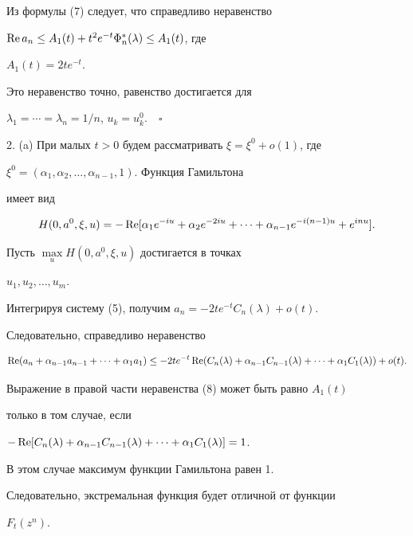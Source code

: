 Из формулы (7) следует, что справедливо неравенство 


$\operatorname{Re} a_n\le A_1(t)+t^2e^{-t}\Phi^*_n(\lambda)\le A_1(t)$, где 


$A_1(t)=2t e^{-t}$. 


Это неравенство точно, равенство достигается для 


$\lambda_1=\dotsb=\lambda_n=1/n$, $u_k=u^0_k$.$\quad\square$ 


\smallskip 


 


2. (a) При малых $t>0$ будем рассматривать $\xi=\xi^0+o(1)$, где 


$\xi^0=(\alpha_1,\alpha_2,\dotsc,\alpha_{n-1},1)$. Функция Гамильтона 


имеет вид 


$$ 


H(0,a^0,\xi,u)=-\re[\alpha_1 e^{-i u}+\alpha_2e^{-2i u}+\dotsb+ 


\alpha_{n-1}e^{-i(n-1)u}+e^{i n u}]. 


$$ 


Пусть $\max\limits_u H(0,a^0,\xi,u)$ достигается в точках 


$u_1,u_2,\dotsc,u_m$. 


Интегрируя систему (5), получим $a_n=-2t e^{-t}C_n(\lambda)+o(t)$. 


Следовательно, справедливо неравенство 


\begin{equation} 


\re (a_n+\alpha_{n-1}a_{n-1}+\dotsb+\alpha_1a_1)\le-2t e^{-t}\re 


(C_n(\lambda)+\alpha_{n-1}C_{n-1}(\lambda)+\dotsb+ 


\alpha_1C_1(\lambda))+o(t). 


\end{equation} 


Выражение в правой части неравенства (8) может быть равно $A_1(t)$ 


только в том случае, если 


$-\re[C_n(\lambda)+\alpha_{n-1}C_{n-1}(\lambda)+\dotsb+ 


\alpha_1C_1(\lambda)]=1$. 


В этом случае максимум функции Гамильтона равен 1. 


Следовательно, экстремальная функция будет отличной от функции 


$F_t(z^n)$. 


\smallskip 


